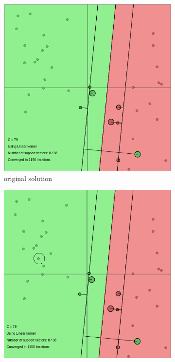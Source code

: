 \documentclass{article}
\begin{document}
    \begin{figure}[]
        \begin{subfigure}{0.33\linewidth}
            \includegraphics[width=\linewidth]{add1}
            \caption{original solution}
        \end{subfigure}
        \begin{subfigure}{0.33\linewidth}
            \includegraphics[width=\linewidth]{add2}

\end{subfigure}
\end{figure}
\end{document}
